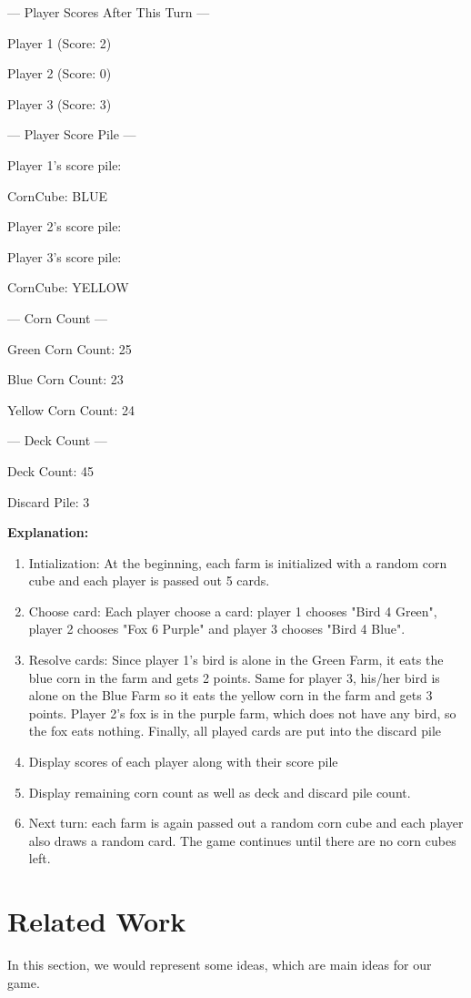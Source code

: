 \documentclass[conference]{IEEEtran}
\begin{document}
--- Player Scores After This Turn ---

Player 1 (Score: 2)

Player 2 (Score: 0)

Player 3 (Score: 3)

--- Player Score Pile ---

Player 1's score pile:

CornCube: BLUE

Player 2's score pile:

Player 3's score pile:

CornCube: YELLOW

--- Corn Count ---

Green Corn Count: 25

Blue Corn Count: 23

Yellow Corn Count: 24

--- Deck Count ---

Deck Count: 45

Discard Pile: 3

\vspace{0.2cm}

\textbf{Explanation:}

\begin{enumerate}
    \item Intialization: At the beginning, each farm is initialized with a random corn cube and each player is passed out 5 cards.
    \item Choose card: Each player choose a card: player 1 chooses "Bird 4 Green", player 2 chooses "Fox 6 Purple" and player 3 chooses "Bird 4 Blue".
    \item Resolve cards: Since player 1's bird is alone in the Green Farm, it eats the blue corn in the farm and gets 2 points. Same for player 3, his/her bird is alone on the Blue Farm so it eats the yellow corn in the farm and gets 3 points. Player 2's fox is in the purple farm, which does not have any bird, so the fox eats nothing. Finally, all played cards are put into the discard pile
    \item Display scores of each player along with their score pile
    \item Display remaining corn count as well as deck and discard pile count.
    \item Next turn: each farm is again passed out a random corn cube and each player also draws a random card. The game continues until there are no corn cubes left.
\end{enumerate}


\section{Related Work}
In this section, we would represent some ideas, which are main ideas for our game.
\end{document}
